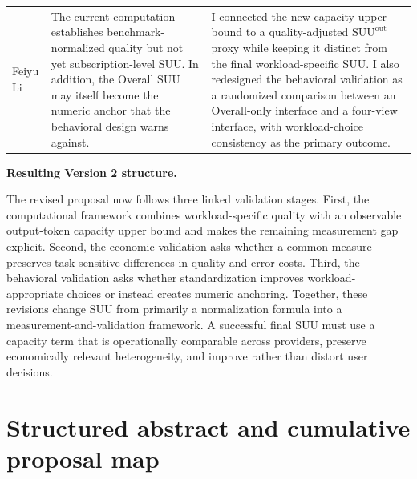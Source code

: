 \documentclass[sigconf,nonacm]{acmart}
\begin{document}
\begin{longtable}{
@{}
p{}
p{}
p{}
@{}
}
\addlinespace

Feiyu Li
&
The current computation establishes benchmark-normalized quality but not yet
subscription-level SUU. In addition, the Overall SUU may itself become the
numeric anchor that the behavioral design warns against.
&
I connected the new capacity upper bound to a quality-adjusted
$\mathrm{SUU}^{\mathrm{out}}$ proxy while keeping it distinct from the final
workload-specific SUU. I also redesigned the behavioral validation as a
randomized comparison between an Overall-only interface and a four-view
interface, with workload-choice consistency as the primary outcome.
\\

\end{longtable}

\vspace{0.5em}

\textbf{Resulting Version 2 structure.}

The revised proposal now follows three linked validation stages.
First, the computational framework combines workload-specific quality with an
observable output-token capacity upper bound and makes the remaining measurement
gap explicit. Second, the economic validation asks whether a common measure
preserves task-sensitive differences in quality and error costs. Third, the
behavioral validation asks whether standardization improves workload-appropriate
choices or instead creates numeric anchoring. Together, these revisions change SUU from primarily a normalization formula into
a measurement-and-validation framework. A successful final SUU must use a
capacity term that is operationally comparable across providers, preserve
economically relevant heterogeneity, and improve rather than distort user
decisions.


\clearpage

\section{Structured abstract and cumulative proposal map}
\label{app:abstract}
\end{document}
